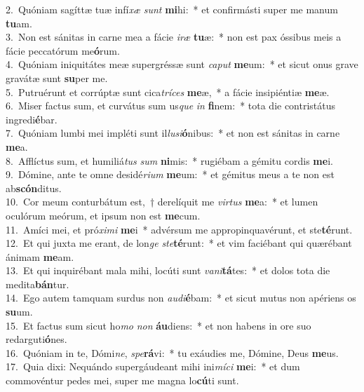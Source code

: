 {2.~}Quóniam sagíttæ tuæ infí\textit{xæ} \textit{sunt} \textbf{mi}hi:~* et confirmásti super me manum \textbf{tu}am.\\
{3.~}Non est sánitas in carne mea a fácie \textit{i}\textit{ræ} \textbf{tu}æ:~* non est pax óssibus meis a fácie peccatórum me\textbf{ó}rum.\\
{4.~}Quóniam iniquitátes meæ supergréssæ sunt \textit{ca}\textit{put} \textbf{me}um:~* et sicut onus grave gravátæ sunt \textbf{su}per me.\\
{5.~}Putruérunt et corrúptæ sunt cica\textit{trí}\textit{ces} \textbf{me}æ,~* a fácie insipiéntiæ \textbf{me}æ.\\
{6.~}Miser factus sum, et curvátus sum us\textit{que} \textit{in} \textbf{fi}nem:~* tota die contristátus ingredi\textbf{é}bar.\\
{7.~}Quóniam lumbi mei impléti sunt il\textit{lu}\textit{si}\textbf{ó}nibus:~* et non est sánitas in carne \textbf{me}a.\\
{8.~}Afflíctus sum, et humiliá\textit{tus} \textit{sum} \textbf{ni}mis:~* rugiébam a gémitu cordis \textbf{me}i.\\
{9.~}Dómine, ante te omne desidé\textit{ri}\textit{um} \textbf{me}um:~* et gémitus meus a te non est ab\textbf{scón}ditus.\\
{10.~}Cor meum conturbátum est,~† derelíquit me \textit{vir}\textit{tus} \textbf{me}a:~* et lumen oculórum meórum, et ipsum non est \textbf{me}cum.\\
{11.~}Amíci mei, et pró\textit{xi}\textit{mi} \textbf{me}i~* advérsum me appropinquavérunt, et ste\textbf{té}runt.\\
{12.~}Et qui juxta me erant, de lon\textit{ge} \textit{ste}\textbf{té}runt:~* et vim faciébant qui quærébant ánimam \textbf{me}am.\\
{13.~}Et qui inquirébant mala mihi, locúti sunt \textit{va}\textit{ni}\textbf{tá}tes:~* et dolos tota die medita\textbf{bán}tur.\\
{14.~}Ego autem tamquam surdus non \textit{au}\textit{di}\textbf{é}bam:~* et sicut mutus non apériens os \textbf{su}um.\\
{15.~}Et factus sum sicut ho\textit{mo} \textit{non} \textbf{áu}diens:~* et non habens in ore suo redarguti\textbf{ó}nes.\\
{16.~}Quóniam in te, Dómi\textit{ne}, \textit{spe}\textbf{rá}vi:~* tu exáudies me, Dómine, Deus \textbf{me}us.\\
{17.~}Quia dixi: Nequándo supergáudeant mihi ini\textit{mí}\textit{ci} \textbf{me}i:~* et dum commovéntur pedes mei, super me magna lo\textbf{cú}ti sunt.\\
